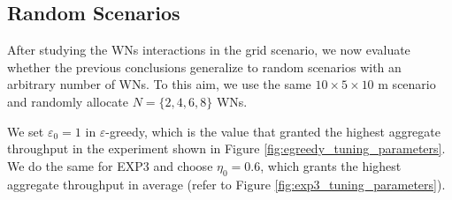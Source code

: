 \documentclass[10pt,journal,compsoc]{IEEEtran}
\begin{document}
	
	\subsection{Random Scenarios}
	\label{section:random}
	After studying the WNs interactions in the grid scenario, we now evaluate whether the previous conclusions generalize to random scenarios with an arbitrary number of WNs. To this aim, we use the same $10\times5\times 10$ m scenario and randomly allocate $N = \{2, 4, 6, 8\}$ WNs. %
	
	We set $\varepsilon_0 = 1$ in $\varepsilon$-greedy, which is the value that granted the highest aggregate throughput in the experiment shown in Figure \ref{fig:egreedy_tuning_parameters}. We do the same for EXP3 and choose $\eta_0 = 0.6$, which grants the highest aggregate throughput in average (refer to Figure \ref{fig:exp3_tuning_parameters}).
	
\end{document}
